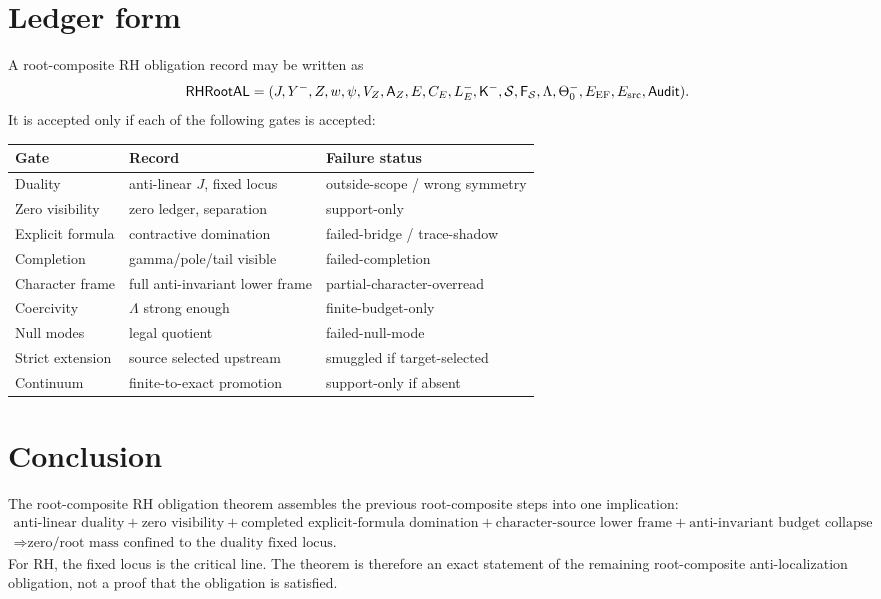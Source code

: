 \documentclass[11pt]{article}
\newcommand{\K}{\mathsf K}
\newcommand{\A}{\mathsf A}
\newcommand{\F}{\mathsf F}
\begin{document}
\section{Ledger form}

A root-composite RH obligation record may be written as
\[
\mathsf{RHRootAL}=
(J,Y^-,Z,w,\psi,V_Z,\A_Z,E,C_E,L_E^-,\K^-,\mathcal S,\F_\mathcal S,\Lambda,\Theta_0^-,E_{\rm EF},E_{\rm src},\mathsf{Audit}).
\]
It is accepted only if each of the following gates is accepted:
\begin{center}
\begin{tabular}{lll}
\toprule
Gate & Record & Failure status\\
\midrule
Duality & anti-linear \(J\), fixed locus & outside-scope / wrong symmetry\\
Zero visibility & zero ledger, separation & support-only\\
Explicit formula & contractive domination & failed-bridge / trace-shadow\\
Completion & gamma/pole/tail visible & failed-completion\\
Character frame & full anti-invariant lower frame & partial-character-overread\\
Coercivity & \(\Lambda\) strong enough & finite-budget-only\\
Null modes & legal quotient & failed-null-mode\\
Strict extension & source selected upstream & smuggled if target-selected\\
Continuum & finite-to-exact promotion & support-only if absent\\
\bottomrule
\end{tabular}
\end{center}

\section{Conclusion}

The root-composite RH obligation theorem assembles the previous root-composite steps into one implication:
\[
\boxed{
\begin{gathered}
\text{anti-linear duality}
+\text{zero visibility}
+\text{completed explicit-formula domination}
+\text{character-source lower frame}
+\text{anti-invariant budget collapse} \\
\Longrightarrow
\text{zero/root mass confined to the duality fixed locus.}
\end{gathered}
}
\]
For RH, the fixed locus is the critical line.  The theorem is therefore an exact statement of the remaining root-composite anti-localization obligation, not a proof that the obligation is satisfied.
\end{document}
